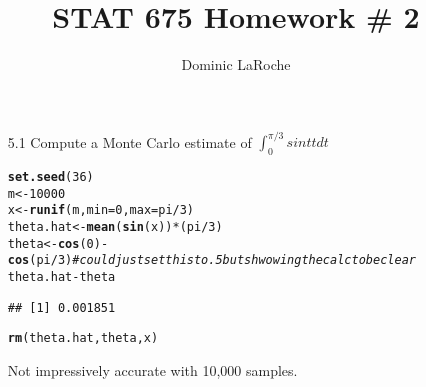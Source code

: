 \documentclass{article}\usepackage[]{graphicx}\usepackage[]{color}
\title{STAT 675 Homework \# 2}
\author{Dominic LaRoche}
\makeatletter
\newcommand{\hlcom}[1]{\textcolor[rgb]{0.678,0.584,0.686}{\textit{#1}}}%
\newcommand{\hlkwd}[1]{\textcolor[rgb]{0.737,0.353,0.396}{\textbf{#1}}}%
\newenvironment{kframe}{%
 \def\at@end@of@kframe{}%
 \ifinner\ifhmode%
  \def\at@end@of@kframe{\end{minipage}}%
  \begin{minipage}{\columnwidth}%
 \fi\fi%
 \def\FrameCommand##1{\hskip\@totalleftmargin \hskip-\fboxsep
 \colorbox{shadecolor}{##1}\hskip-\fboxsep
     \hskip-\linewidth \hskip-\@totalleftmargin \hskip\columnwidth}%
 \MakeFramed {\advance\hsize-\width
   \@totalleftmargin\z@ \linewidth\hsize
   \@setminipage}}%
 {\par\unskip\endMakeFramed%
 \at@end@of@kframe}
\newenvironment{knitrout}{}{} %
\makeatother
\begin{document}
\maketitle

\begin{itemize}



\item[5.1] Compute a Monte Carlo estimate of $\int_0^{\pi/3} sinttdt$\\
\begin{knitrout}
\color{fgcolor}\begin{kframe}
\begin{alltt}
\hlkwd{set.seed}(36)
m <- 10000
x <- \hlkwd{runif}(m, min = 0, max = pi/3)
theta.hat <- \hlkwd{mean}(\hlkwd{sin}(x)) * (pi/3)
theta <- \hlkwd{cos}(0) - \hlkwd{cos}(pi/3)  \hlcom{#could just set this to .5 but shwowing the calc to be clear}
theta.hat - theta
\end{alltt}
\begin{verbatim}
## [1] 0.001851
\end{verbatim}
\begin{alltt}
\hlkwd{rm}(theta.hat, theta, x)
\end{alltt}
\end{kframe}
\end{knitrout}

Not impressively accurate with 10,000 samples.


\end{itemize}
\end{document}
